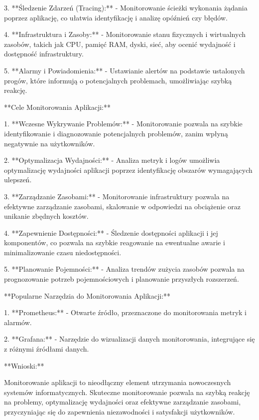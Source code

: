 3. **Śledzenie Zdarzeń (Tracing):**
   - Monitorowanie ścieżki wykonania żądania poprzez aplikację, co ułatwia identyfikację i analizę opóźnień czy błędów.

4. **Infrastruktura i Zasoby:**
   - Monitorowanie stanu fizycznych i wirtualnych zasobów, takich jak CPU, pamięć RAM, dyski, sieć, aby ocenić wydajność i dostępność infrastruktury.

5. **Alarmy i Powiadomienia:**
   - Ustawianie alertów na podstawie ustalonych progów, które informują o potencjalnych problemach, umożliwiając szybką reakcję.

**Cele Monitorowania Aplikacji:**

1. **Wczesne Wykrywanie Problemów:**
   - Monitorowanie pozwala na szybkie identyfikowanie i diagnozowanie potencjalnych problemów, zanim wpłyną negatywnie na użytkowników.

2. **Optymalizacja Wydajności:**
   - Analiza metryk i logów umożliwia optymalizację wydajności aplikacji poprzez identyfikację obszarów wymagających ulepszeń.

3. **Zarządzanie Zasobami:**
   - Monitorowanie infrastruktury pozwala na efektywne zarządzanie zasobami, skalowanie w odpowiedzi na obciążenie oraz unikanie zbędnych kosztów.

4. **Zapewnienie Dostępności:**
   - Śledzenie dostępności aplikacji i jej komponentów, co pozwala na szybkie reagowanie na ewentualne awarie i minimalizowanie czasu niedostępności.

5. **Planowanie Pojemności:**
   - Analiza trendów zużycia zasobów pozwala na prognozowanie potrzeb pojemnościowych i planowanie przyszłych rozszerzeń.

**Popularne Narzędzia do Monitorowania Aplikacji:**

1. **Prometheus:**
   - Otwarte źródło, przeznaczone do monitorowania metryk i alarmów.

2. **Grafana:**
   - Narzędzie do wizualizacji danych monitorowania, integrujące się z różnymi źródłami danych.

**Wnioski:**

Monitorowanie aplikacji to nieodłączny element utrzymania nowoczesnych systemów informatycznych. Skuteczne monitorowanie pozwala na szybką reakcję na problemy, optymalizację wydajności oraz efektywne zarządzanie zasobami, przyczyniając się do zapewnienia niezawodności i satysfakcji użytkowników.
